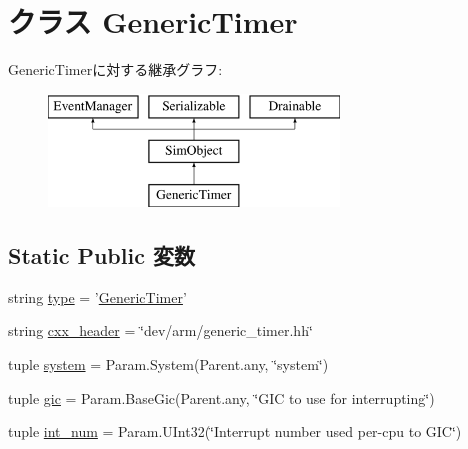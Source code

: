 \hypertarget{classRealView_1_1GenericTimer}{
\section{クラス GenericTimer}
\label{classRealView_1_1GenericTimer}
}
GenericTimerに対する継承グラフ:\begin{figure}[H]
\begin{center}
\leavevmode
\includegraphics[height=3cm]{classRealView_1_1GenericTimer}
\end{center}
\end{figure}
\subsection*{Static Public 変数}
\begin{DoxyCompactItemize}
\item 
string \hyperlink{classRealView_1_1GenericTimer_acce15679d830831b0bbe8ebc2a60b2ca}{type} = '\hyperlink{classRealView_1_1GenericTimer}{GenericTimer}'
\item 
string \hyperlink{classRealView_1_1GenericTimer_a17da7064bc5c518791f0c891eff05fda}{cxx\_\-header} = \char`\"{}dev/arm/generic\_\-timer.hh\char`\"{}
\item 
tuple \hyperlink{classRealView_1_1GenericTimer_ab737471139f5a296e5b26e8a0e1b0744}{system} = Param.System(Parent.any, \char`\"{}system\char`\"{})
\item 
tuple \hyperlink{classRealView_1_1GenericTimer_a40243beb62d217c3a9e35801ae739fd0}{gic} = Param.BaseGic(Parent.any, \char`\"{}GIC to use for interrupting\char`\"{})
\item 
tuple \hyperlink{classRealView_1_1GenericTimer_a65fded6db751c1b9aa7168b29056e819}{int\_\-num} = Param.UInt32(\char`\"{}Interrupt number used per-\/cpu to GIC\char`\"{})
\end{DoxyCompactItemize}


